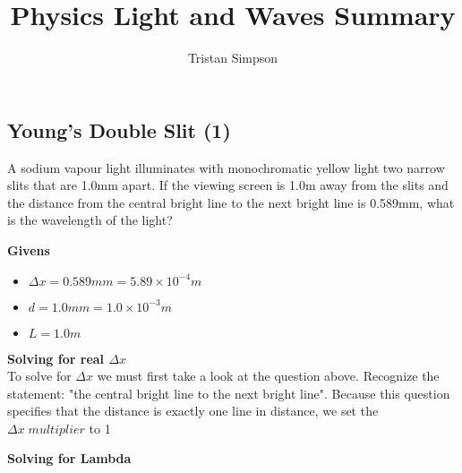 \documentclass{article}
\title{Physics Light and Waves Summary}
\author{Tristan Simpson}
\begin{document}
\maketitle









\begin{adjustwidth}{1cm}{0pt}
    \subsection{Young's Double Slit (1)}
    \begin{adjustwidth}{0.5cm}{0pt}
        A sodium vapour light illuminates with monochromatic yellow light two narrow slits that are 1.0mm apart.
        If the viewing screen is 1.0m away from the slits and the distance from the central bright line to the
        next bright line is 0.589mm, what is the wavelength of the light?\newline

        \noindent\textbf{Givens}
        \begin{itemize}
            \item $\Delta x = 0.589mm = 5.89 \times 10^{-4}m$
            \item $d = 1.0mm = 1.0 \times 10^{-3}m$
            \item $L = 1.0m$
        \end{itemize}\leavevmode\newline

        \noindent\textbf{Solving for real $\Delta x$}\\
        To solve for $\Delta x$ we must first take a look at the question above.
        Recognize the statement: "the central bright line to the next bright line".
        Because this question specifies that the distance is exactly one line in distance, we set the $\Delta x\;multiplier$ to 1

        \newline

        \noindent\textbf{Solving for Lambda}
    \end{adjustwidth}
\end{adjustwidth}
\end{document}
